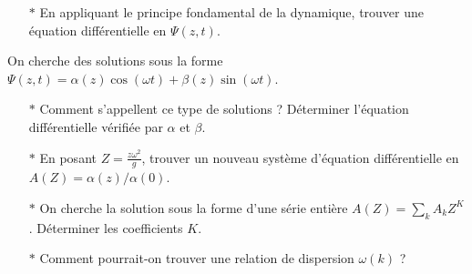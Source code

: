 \documentclass{report}
\begin{document}
\begin{itemize}

	\item[$\ast$] En appliquant le principe fondamental de la dynamique, trouver une équation différentielle en  $\Psi(z,t)$.

\end{itemize}

On cherche des solutions sous la forme $\Psi(z,t)=\alpha(z)\cos(\omega t)+\beta(z)\sin(\omega t)$. 

\begin{itemize}
	
		\item[$\ast$] Comment s'appellent ce type de solutions ? Déterminer l'équation différentielle vérifiée par $\alpha$ et $\beta$.
		
		\item[$\ast$] En posant $Z=\frac{z\omega^2}{g}$, trouver un nouveau système d'équation différentielle en $A(Z)=\alpha(z)/\alpha(0)$. 
		
		\item[$\ast$] On cherche la solution sous la forme d'une série entière $A(Z)=\sum_k A_k Z^K$. Déterminer les coefficients $K$. 
		
		\item[$\ast$] Comment pourrait-on trouver une relation de dispersion $\omega(k)$ ?
		
\end{itemize}
\end{document}
